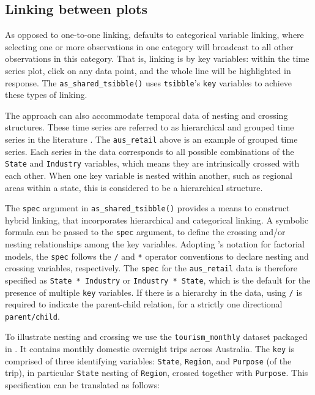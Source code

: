 \hypertarget{linking-between-plots}{%
\subsection{Linking between plots}\label{linking-between-plots}}

As opposed to one-to-one linking,  defaults to
categorical variable linking, where selecting one or more observations
in one category will broadcast to all other observations in this
category. That is, linking is by key variables: within the time series
plot, click on any data point, and the whole line will be highlighted in
response. The \texttt{as\_shared\_tsibble()} uses \texttt{tsibble}'s
\texttt{key} variables to achieve these types of linking.

The approach can also accommodate temporal data of nesting and crossing
structures. These time series are referred to as hierarchical and
grouped time series in the literature \citep{fpp}. The
\texttt{aus\_retail} above is an example of grouped time series. Each
series in the data corresponds to all possible combinations of the
\texttt{State} and \texttt{Industry} variables, which means they are
intrinsically crossed with each other. When one key variable is nested
within another, such as regional areas within a state, this is
considered to be a hierarchical structure.

The \texttt{spec} argument in \texttt{as\_shared\_tsibble()} provides a
means to construct hybrid linking, that incorporates hierarchical and
categorical linking. A symbolic formula can be passed to the
\texttt{spec} argument, to define the crossing and/or nesting
relationships among the key variables. Adopting \citet{Wilkinson1973}'s
notation for factorial models, the \texttt{spec} follows the \texttt{/}
and \texttt{*} operator conventions to declare nesting and crossing
variables, respectively. The \texttt{spec} for the \texttt{aus\_retail}
data is therefore specified as \texttt{State\ *\ Industry} or
\texttt{Industry\ *\ State}, which is the default for the presence of
multiple \texttt{key} variables. If there is a hierarchy in the data,
using \texttt{/} is required to indicate the parent-child relation, for
a strictly one directional \texttt{parent/child}.

To illustrate nesting and crossing we use the \texttt{tourism\_monthly}
dataset \citep{tourism} packaged in . It contains
monthly domestic overnight trips across Australia. The \texttt{key} is
comprised of three identifying variables: \texttt{State},
\texttt{Region}, and \texttt{Purpose} (of the trip), in particular
\texttt{State} nesting of \texttt{Region}, crossed together with
\texttt{Purpose}. This specification can be translated as follows:

